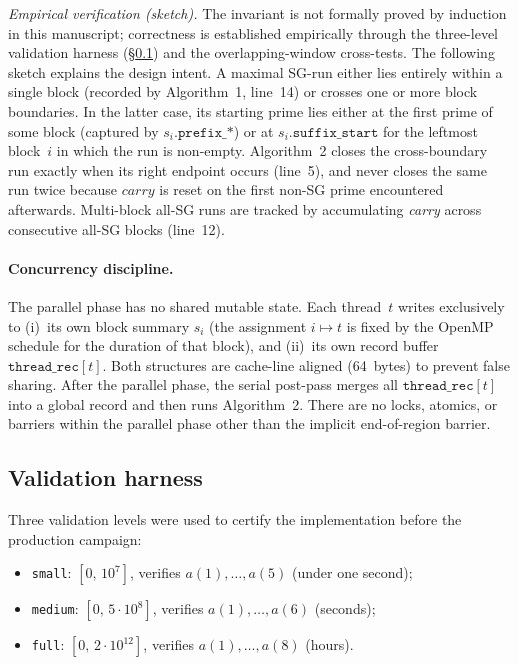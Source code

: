 \documentclass[11pt,a4paper]{article}
\theoremstyle{definition}
\begin{document}
\noindent\emph{Empirical verification (sketch).}
The invariant is not formally proved by induction in this manuscript;
correctness is established empirically through the three-level validation
harness (§\ref{sec:validation}) and the overlapping-window cross-tests.
The following sketch explains the design intent. A maximal SG-run either
lies entirely within a single block (recorded by Algorithm~1, line~14) or
crosses one or more block boundaries. In the latter case, its starting
prime lies either at the first prime of some block (captured by
$s_i.\texttt{prefix\_*}$) or at $s_i.\texttt{suffix\_start}$ for the
leftmost block~$i$ in which the run is non-empty. Algorithm~2 closes the
cross-boundary run exactly when its right endpoint occurs (line~5), and
never closes the same run twice because $\textit{carry}$ is reset on the
first non-SG prime encountered afterwards. Multi-block all-SG runs are
tracked by accumulating \textit{carry} across consecutive all-SG blocks
(line~12).

\paragraph{Concurrency discipline.}
The parallel phase has no shared mutable state. Each thread~$t$ writes
exclusively to (i)~its own block summary $s_i$ (the assignment $i \mapsto
t$ is fixed by the OpenMP schedule for the duration of that block), and
(ii)~its own record buffer $\texttt{thread\_rec}[t]$. Both structures
are cache-line aligned (64~bytes) to prevent false sharing. After the
parallel phase, the serial post-pass merges all $\texttt{thread\_rec}[t]$
into a global record and then runs Algorithm~2. There are no locks,
atomics, or barriers within the parallel phase other than the implicit
end-of-region barrier.

\subsection{Validation harness}
\label{sec:validation}

Three validation levels were used to certify the implementation before
the production campaign:

\begin{itemize}
\item \texttt{small}: $[0,\,10^7]$, verifies $a(1),\ldots,a(5)$
(under one second);
\item \texttt{medium}: $[0,\,5\cdot 10^8]$, verifies $a(1),\ldots,a(6)$
(seconds);
\item \texttt{full}: $[0,\,2\cdot 10^{12}]$, verifies $a(1),\ldots,a(8)$
(hours).
\end{itemize}
\end{document}
